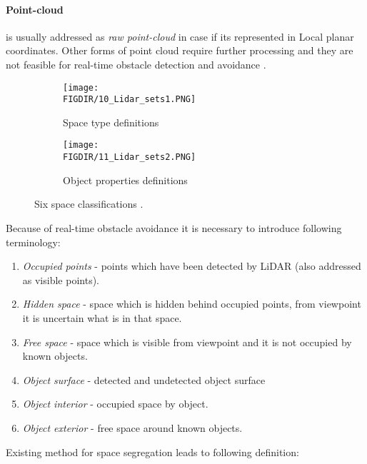 \paragraph{Point-cloud} is usually addressed as \textit{raw point-cloud} in case if its represented in Local planar coordinates. Other forms of point cloud require further processing and they are not feasible for real-time obstacle detection and avoidance \cite{chen2007airborne}.

\begin{figure}[H]
    
    \begin{subfigure}{0.45\textwidth}
        \centering
        \texttt{[image: \\FIGDIR/10\_Lidar\_sets1.PNG]} 
        \caption{Space type definitions}
        \label{fig:Spacetypes}
    \end{subfigure}
    \begin{subfigure}{0.45\textwidth}
        \centering
        \texttt{[image: \\FIGDIR/11\_Lidar\_sets2.PNG]}
        \caption{Object properties definitions}
        \label{fig:ObectProperties}
    \end{subfigure}
    
    \caption{Six space classifications \cite{yapo2008probabilistic}.}
    \label{fig:Spaces of interests}
 \end{figure}
 
\noindent  Because of real-time obstacle avoidance it is necessary to introduce following terminology:
\begin{enumerate}
    \item \textit{Occupied points} - points which have been detected by LiDAR (also addressed as visible points).
    \item \textit{Hidden space} - space which is hidden behind occupied points, from viewpoint it is uncertain what is in that space. 
    \item \textit{Free space} - space which is visible from viewpoint and it is not occupied by known objects.
    \item \textit{Object surface} - detected and undetected object surface
    \item \textit{Object interior} - occupied space by object.
    \item \textit{Object exterior} - free space around known objects.
\end{enumerate}

\noindent Existing method for space segregation \cite{yapo2008probabilistic} leads to following definition:

